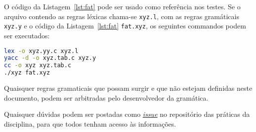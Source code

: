 \documentclass{article}
\begin{document}
O código da Listagem~\ref{lst:fat} pode ser usado como referência
nos testes. Se o arquivo contendo as regras léxicas chama-se 
{\tt xyz.l}, com as regras gramáticais {\tt xyz.y} e o 
código da Listagem~\ref{lst:fat} {\tt fat.xyz}, os seguintes 
commandos podem ser executados:

\begin{lstlisting}[language=bash]
lex -o xyz.yy.c xyz.l
yacc -d -o xyz.tab.c xyz.y
cc -o xyz xyz.tab.c
./xyz fat.xyz
\end{lstlisting}

Quaisquer regras gramaticais que possam surgir 
e que não estejam definidas neste documento,
podem ser arbitradas pelo desenvolvedor da
gramática.

Quaisquer dúvidas podem ser postadas como 
\href{https://github.com/ajholanda/edu-compiladores/issues}{{\it issue}}
no repositório das práticas da disciplina, para que todos
tenham acesso às informações.
\end{document}
